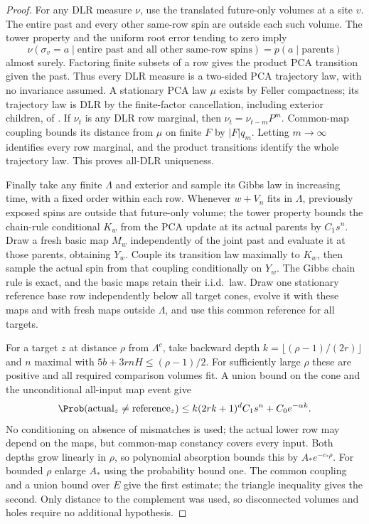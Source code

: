\begin{proof}
For any DLR measure $\nu$, use the translated future-only volumes at a site $v$. The entire past and every other same-row spin are outside each such volume. The tower property and the uniform root error tending to zero imply
\[
 \nu(\sigma_v=a\mid\text{entire past and all other same-row spins})
 =p(a\mid\text{parents})
\]
almost surely. Factoring finite subsets of a row gives the product PCA transition given the past. Thus every DLR measure is a two-sided PCA trajectory law, with no invariance assumed. A stationary PCA law $\mu$ exists by Feller compactness; its trajectory law is DLR by the finite-factor cancellation, including exterior children, of \cite[Lemma~2.4]{DMst}. If $\nu_t$ is any DLR row marginal, then $\nu_t=\nu_{t-m}P^m$. Common-map coupling bounds its distance from $\mu$ on finite $F$ by $|F|q_m$. Letting $m\to\infty$ identifies every row marginal, and the product transitions identify the whole trajectory law. This proves all-DLR uniqueness.

Finally take any finite $\Lambda$ and exterior and sample its Gibbs law in increasing time, with a fixed order within each row. Whenever $w+V_n$ fits in $\Lambda$, previously exposed spins are outside that future-only volume; the tower property bounds the chain-rule conditional $K_w$ from the PCA update at its actual parents by $C_1s^n$. Draw a fresh basic map $M_w$ independently of the joint past and evaluate it at those parents, obtaining $Y_w$. Couple its transition law maximally to $K_w$, then sample the actual spin from that coupling conditionally on $Y_w$. The Gibbs chain rule is exact, and the basic maps retain their i.i.d.\ law. Draw one stationary reference base row independently below all target cones, evolve it with these maps and with fresh maps outside $\Lambda$, and use this common reference for all targets.

For a target $z$ at distance $\rho$ from $\Lambda^c$, take backward depth $k=\lfloor(\rho-1)/(2r)\rfloor$ and $n$ maximal with $5b+3rnH\le(\rho-1)/2$. For sufficiently large $\rho$ these are positive and all required comparison volumes fit. A union bound on the cone and the unconditional all-input map event give
\[
 \Prob(\text{actual}_z\ne\text{reference}_z)
 \le k(2rk+1)^d C_1s^n+C_0e^{-\alpha k}.
\]
No conditioning on absence of mismatches is used; the actual lower row may depend on the maps, but common-map constancy covers every input. Both depths grow linearly in $\rho$, so polynomial absorption bounds this by $A_*e^{-c_*\rho}$. For bounded $\rho$ enlarge $A_*$ using the probability bound one. The common coupling and a union bound over $E$ give the first estimate; the triangle inequality gives the second. Only distance to the complement was used, so disconnected volumes and holes require no additional hypothesis.
\end{proof}


